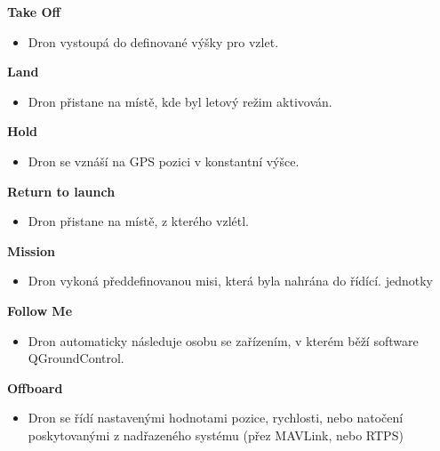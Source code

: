 \noindent\textbf{Take Off}

\begin{itemize}
    \item Dron vystoupá do definované výšky pro vzlet.
\end{itemize}

\noindent\textbf{Land}

\begin{itemize}
    \item Dron přistane na místě, kde byl letový režim aktivován.
\end{itemize}

\noindent\textbf{Hold}

\begin{itemize}
    \item Dron se vznáší na GPS pozici v konstantní výšce.
\end{itemize}

\noindent\textbf{Return to launch}

\begin{itemize}
    \item Dron přistane na místě, z kterého vzlétl.
\end{itemize}

\noindent\textbf{Mission}

\begin{itemize}
    \item Dron vykoná předdefinovanou misi, která byla nahrána do řídící. jednotky
\end{itemize}

\noindent\textbf{Follow Me}

\begin{itemize}
    \item Dron automaticky následuje osobu se zařízením, v kterém běží software QGroundControl.
\end{itemize}

\noindent\textbf{Offboard}

\begin{itemize}
    \item Dron se řídí nastavenými hodnotami pozice, rychlosti, nebo natočení poskytovanými z nadřazeného systému (přez MAVLink, nebo \acs{RTPS})
\end{itemize}



